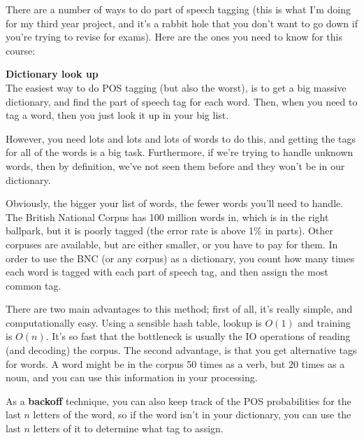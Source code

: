 There are a number of ways to do part of speech tagging (this is what I'm doing
for my third year project, and it's a rabbit hole that you don't want to go down
if you're trying to revise for exams). Here are the ones you need to know for
this course:

\begin{description}


  \item \textbf{Dictionary look up}\\
  The easiest way to do POS tagging (but also the worst), is to get a big
  massive dictionary, and find the part of speech tag for each word. Then, when
  you need to tag a word, then you just look it up in your big list.

  However, you need lots and lots and lots of words to do this, and getting the
  tags for all of the words is a big task. Furthermore, if we're trying to
  handle unknown words, then by definition, we've not seen them before and they
  won't be in our dictionary.

  Obviously, the bigger your list of words, the fewer words you'll need to
  handle. The British National Corpus has 100 million words in, which is in the
  right ballpark, but it is poorly tagged (the error rate is above 1\% in
  parts). Other corpuses are available, but are either smaller, or you have to
  pay for them. In order to use the BNC (or any corpus) as a dictionary, you
  count how many times each word is tagged with each part of speech tag, and
  then assign the most common tag.

  There are two main advantages to this method; first of all, it's really
  simple, and computationally easy. Using a sensible hash table, lookup is
  $O(1)$ and training is $O(n)$. It's so fast that the bottleneck is usually the
  IO operations of reading (and decoding) the corpus. The second advantage, is
  that you get alternative tags for words. A word might be in the corpus 50
  times as a verb, but 20 times as a noun, and you can use this information in
  your processing.

  As a \textbf{backoff} technique, you can also keep track of the POS
  probabilities for the last $n$ letters of the word, so if the word isn't in
  your dictionary, you can use the last $n$ letters of it to determine what tag
  to assign.


\end{description}
